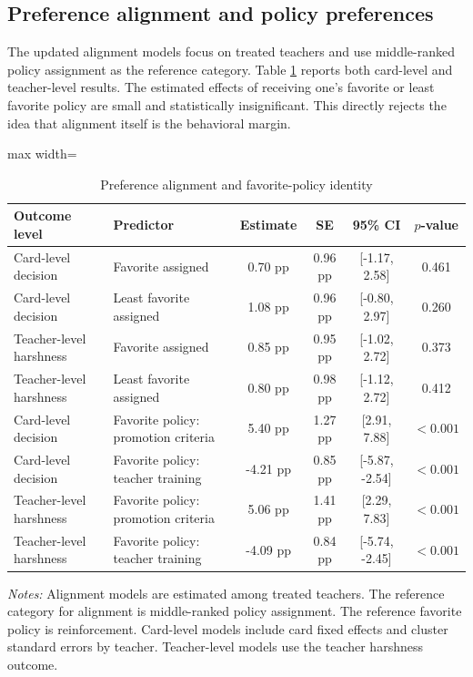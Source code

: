 \documentclass[12pt,a4paper]{article}
\newcommand{\ci}[2]{[#1, #2]}
\newcommand{\tabnote}[1]{\vspace{0.3em}\parbox{0.94\textwidth}{\footnotesize \textit{Notes:} #1}}
\begin{document}
\subsection{Preference alignment and policy preferences}

The updated alignment models focus on treated teachers and use middle-ranked policy assignment as the reference category. Table \ref{tab:alignment} reports both card-level and teacher-level results. The estimated effects of receiving one's favorite or least favorite policy are small and statistically insignificant. This directly rejects the idea that alignment itself is the behavioral margin.

\begin{table}[!htbp]
\centering
\caption{Preference alignment and favorite-policy identity}
\label{tab:alignment}
\begin{threeparttable}
\begin{adjustbox}{max width=\textwidth}
\begin{tabular}{llcccc}
\toprule
Outcome level & Predictor & Estimate & SE & 95\% CI & \(p\)-value \\
\midrule
Card-level decision & Favorite assigned & 0.70 pp & 0.96 pp & \ci{-1.17}{2.58} & 0.461 \\
Card-level decision & Least favorite assigned & 1.08 pp & 0.96 pp & \ci{-0.80}{2.97} & 0.260 \\
Teacher-level harshness & Favorite assigned & 0.85 pp & 0.95 pp & \ci{-1.02}{2.72} & 0.373 \\
Teacher-level harshness & Least favorite assigned & 0.80 pp & 0.98 pp & \ci{-1.12}{2.72} & 0.412 \\
\midrule
Card-level decision & Favorite policy: promotion criteria & 5.40 pp & 1.27 pp & \ci{2.91}{7.88} & \(<0.001\) \\
Card-level decision & Favorite policy: teacher training & -4.21 pp & 0.85 pp & \ci{-5.87}{-2.54} & \(<0.001\) \\
Teacher-level harshness & Favorite policy: promotion criteria & 5.06 pp & 1.41 pp & \ci{2.29}{7.83} & \(<0.001\) \\
Teacher-level harshness & Favorite policy: teacher training & -4.09 pp & 0.84 pp & \ci{-5.74}{-2.45} & \(<0.001\) \\
\bottomrule
\end{tabular}
\end{adjustbox}
\tabnote{Alignment models are estimated among treated teachers. The reference category for alignment is middle-ranked policy assignment. The reference favorite policy is reinforcement. Card-level models include card fixed effects and cluster standard errors by teacher. Teacher-level models use the teacher harshness outcome.}
\end{threeparttable}
\end{table}
\end{document}
